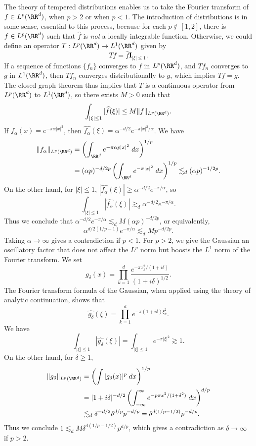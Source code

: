 \begin{example}
  The theory of tempered distributions enables us to take the Fourier transform of $f \in L^p(\RR^d)$, when $p > 2$ or when $p < 1$. The introduction of distributions is in some sense, essential to this process, because for each $p \not \in [1,2]$, there is $f \in L^p(\RR^d)$ such that $\widehat{f}$ is \emph{not} a locally integrable function. Otherwise, we could define an operator $T: L^p(\RR^d) \to L^1(\RR^d)$ given by
  \[ Tf = \widehat{f} \mathbf{I}_{|\xi| \leq 1}. \]
  If a sequence of functions $\{ f_n \}$ converges to $f$ in $L^p(\RR^d)$, and $Tf_n$ converges to $g$ in $L^1(\RR^d)$, then $Tf_n$ converges distributionally to $g$, which implies $Tf = g$. The closed graph theorem thus implies that $T$ is a continuous operator from $L^p(\RR^d)$ to $L^1(\RR^d)$, so there exists $M > 0$ such that
  \[ \int_{|\xi| \leq 1} |\widehat{f}(\xi)| \leq M \| f \|_{L^p(\RR^d)}. \]
  If $f_\alpha(x) = e^{-\pi \alpha |x|^2}$, then $\widehat{f_\alpha}(\xi) = \alpha^{-d/2} e^{-\pi |x|^2 / \alpha}$. We have
  \begin{align*}
    \| f_\alpha \|_{L^p(\RR^d)} &= \left( \int_{\RR^d} e^{- \pi \alpha p |x|^2}\; dx \right)^{1/p}\\
    &= (\alpha p)^{-d/2p} \left( \int_{\RR^d} e^{- \pi |x|^2}\; dx \right)^{1/p} \lesssim_d (\alpha p)^{-1/2p}.
  \end{align*}
  On the other hand, for $|\xi| \leq 1$, $|\widehat{f_\alpha}(\xi)| \geq \alpha^{-d/2} e^{-\pi/\alpha}$, so
  \[ \int_{|\xi| \leq 1} |\widehat{f_\alpha}(\xi)| \gtrsim_d \alpha^{-d/2} e^{-\pi/\alpha}. \]
  Thus we conclude that $\alpha^{-d/2} e^{-\pi/\alpha} \lesssim_d M (\alpha p)^{-d/2p}$, or equivalently,
  \[ \alpha^{d/2(1/p-1)} e^{-\pi/\alpha} \lesssim_d M p^{-d/2p}. \]
  Taking $\alpha \to \infty$ gives a contradiction if $p < 1$. For $p > 2$, we give the Gaussian an oscillatory factor that does not affect the $L^p$ norm but boosts the $L^1$ norm of the Fourier transform. We set
  \[ g_\delta(x) = \prod_{k = 1}^d \frac{e^{- \pi x_k^2 / (1 + i \delta)}}{(1 + i \delta)^{1/2}}. \]
  The Fourier transform formula of the Gaussian, when applied using the theory of analytic continuation, shows that
  \[ \widehat{g_\delta}(\xi) = \prod_{k = 1}^d e^{- \pi (1 + i \delta) \xi_k^2}. \]
  We have
  \[ \int_{|\xi| \leq 1} |\widehat{g_\delta}(\xi)| = \int_{|\xi| \leq 1} e^{- \pi |\xi|^2} \gtrsim 1. \]
  On the other hand, for $\delta \geq 1$,
  \begin{align*}
    \| g_\delta \|_{L^p(\RR^d)} &= \left( \int |g_\delta(x)|^p\; dx \right)^{1/p}\\
    &= |1 + i \delta|^{-d/2} \left( \int_{-\infty}^\infty e^{- p \pi x^2/(1 + \delta^2)}\; dx \right)^{d/p}\\
    &\lesssim_d \delta^{-d/2} \delta^{d/p} p^{-d/p} = \delta^{d(1/p - 1/2)} p^{-d/p}.
  \end{align*}
  Thus we conclude $1 \lesssim_d M \delta^{d(1/p - 1/2)} p^{d/p}$, which gives a contradiction as $\delta \to \infty$ if $p > 2$.
\end{example}

